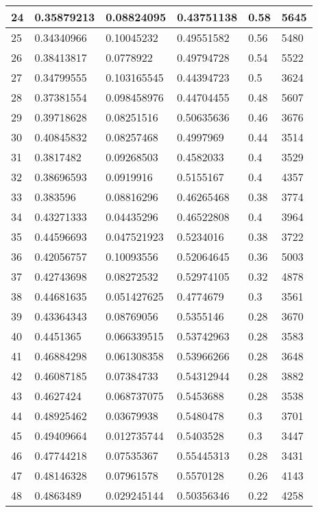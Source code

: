 \begin{longtable}{|l|l|l|l|l|l|}
24 & 0.35879213 & 0.08824095 & 0.43751138 & 0.58 & 5645 \\ \hline 
25 & 0.34340966 & 0.10045232 & 0.49551582 & 0.56 & 5480 \\ \hline 
26 & 0.38413817 & 0.0778922 & 0.49794728 & 0.54 & 5522 \\ \hline 
27 & 0.34799555 & 0.103165545 & 0.44394723 & 0.5 & 3624 \\ \hline 
28 & 0.37381554 & 0.098458976 & 0.44704455 & 0.48 & 5607 \\ \hline 
29 & 0.39718628 & 0.08251516 & 0.50635636 & 0.46 & 3676 \\ \hline 
30 & 0.40845832 & 0.08257468 & 0.4997969 & 0.44 & 3514 \\ \hline 
31 & 0.3817482 & 0.09268503 & 0.4582033 & 0.4 & 3529 \\ \hline 
32 & 0.38696593 & 0.0919916 & 0.5155167 & 0.4 & 4357 \\ \hline 
33 & 0.383596 & 0.08816296 & 0.46265468 & 0.38 & 3774 \\ \hline 
34 & 0.43271333 & 0.04435296 & 0.46522808 & 0.4 & 3964 \\ \hline 
35 & 0.44596693 & 0.047521923 & 0.5234016 & 0.38 & 3722 \\ \hline 
36 & 0.42056757 & 0.10093556 & 0.52064645 & 0.36 & 5003 \\ \hline 
37 & 0.42743698 & 0.08272532 & 0.52974105 & 0.32 & 4878 \\ \hline 
38 & 0.44681635 & 0.051427625 & 0.4774679 & 0.3 & 3561 \\ \hline 
39 & 0.43364343 & 0.08769056 & 0.5355146 & 0.28 & 3670 \\ \hline 
40 & 0.4451365 & 0.066339515 & 0.53742963 & 0.28 & 3583 \\ \hline 
41 & 0.46884298 & 0.061308358 & 0.53966266 & 0.28 & 3648 \\ \hline 
42 & 0.46087185 & 0.07384733 & 0.54312944 & 0.28 & 3882 \\ \hline 
43 & 0.4627424 & 0.068737075 & 0.5453688 & 0.28 & 3538 \\ \hline 
44 & 0.48925462 & 0.03679938 & 0.5480478 & 0.3 & 3701 \\ \hline 
45 & 0.49409664 & 0.012735744 & 0.5403528 & 0.3 & 3447 \\ \hline 
46 & 0.47744218 & 0.07535367 & 0.55445313 & 0.28 & 3431 \\ \hline 
47 & 0.48146328 & 0.07961578 & 0.5570128 & 0.26 & 4143 \\ \hline 
48 & 0.4863489 & 0.029245144 & 0.50356346 & 0.22 & 4258 \\ \hline 

\end{longtable}

